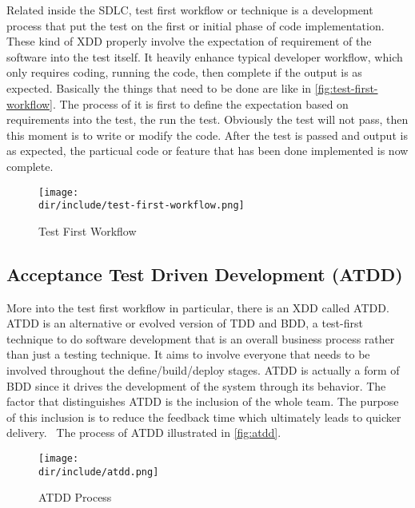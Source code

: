Related inside the \ac{SDLC}, test first workflow or technique is a development process that put the test on the first or initial phase of code implementation.
These kind of \ac{XDD} properly involve the expectation of requirement of the software into the test itself.
It heavily enhance typical developer workflow, which only requires coding, running the code, then complete if the output is as expected.
Basically the things that need to be done are like in \autoref{fig:test-first-workflow}.
The process of it is first to define the expectation based on requirements into the test, the run the test.
Obviously the test will not pass, then this moment is to write or modify the code.
After the test is passed and output is as expected, the particual code or feature that has been done implemented is now complete.

\begin{figure}[!htb]
    \centering
    \texttt{[image: \\dir/include/test-first-workflow.png]}
    \caption{Test First Workflow}
    \label{fig:test-first-workflow}
\end{figure}

\subsection{Acceptance Test Driven Development (ATDD)}

More into the test first workflow in particular, there is an \ac{XDD} called \ac{ATDD}.
\ac{ATDD} is an alternative or evolved version of \ac{TDD} and \ac{BDD}, a test-first technique to do software development that is an overall business process rather than just a testing technique.
It aims to involve everyone that needs to be involved throughout the define/build/deploy stages.
\ac{ATDD} is actually a form of \ac{BDD} since it drives the development of the system through its behavior.
The factor that distinguishes \ac{ATDD} is the inclusion of the whole team.
The purpose of this inclusion is to reduce the feedback time which ultimately leads to quicker delivery.~\autocite{Hatoum:2015:MeteorTestingManual}
The process of \ac{ATDD} illustrated in \autoref{fig:atdd}.

\begin{figure}[!htb]
    \centering
    \texttt{[image: \\dir/include/atdd.png]}
    \caption{ATDD Process}
    \label{fig:atdd}
\end{figure}

